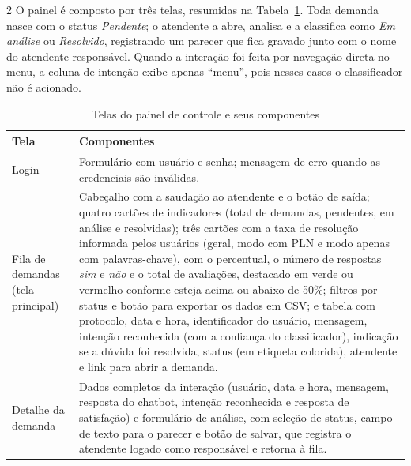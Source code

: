 \documentclass[10pt]{article}
\begin{document}
\begin{multicols}{2}
O painel é composto por três telas, resumidas na Tabela~\ref{tab:painel}.
Toda demanda nasce com o status \textit{Pendente}; o atendente a abre, analisa e
a classifica como \textit{Em análise} ou \textit{Resolvido}, registrando um
parecer que fica gravado junto com o nome do atendente responsável. Quando a
interação foi feita por navegação direta no menu, a coluna de intenção exibe
apenas ``menu'', pois nesses casos o classificador não é acionado.

\end{multicols}
\begin{table}[H]
  \centering
  \begin{tabular}{|p{}|p{}|}
    \hline
    \textbf{Tela} & \textbf{Componentes} \\ \hline
    Login & Formulário com usuário e senha; mensagem de erro quando as
    credenciais são inválidas. \\ \hline
    Fila de demandas (tela principal) &
    Cabeçalho com a saudação ao atendente e o botão de saída;
    quatro cartões de indicadores (total de demandas, pendentes, em análise e
    resolvidas); três cartões com a taxa de resolução informada pelos usuários
    (geral, modo com PLN e modo apenas com palavras-chave), com o percentual,
    o número de respostas \textit{sim} e \textit{não} e o total de avaliações,
    destacado em verde ou vermelho conforme esteja acima ou abaixo de 50\%;
    filtros por status e botão para exportar os dados em CSV; e tabela com
    protocolo, data e hora, identificador do usuário, mensagem, intenção
    reconhecida (com a confiança do classificador), indicação se a dúvida foi
    resolvida, status (em etiqueta colorida), atendente e link para abrir a
    demanda. \\ \hline
    Detalhe da demanda & Dados completos da interação (usuário, data e hora,
    mensagem, resposta do chatbot, intenção reconhecida e resposta de
    satisfação) e formulário de análise, com seleção de status, campo de texto
    para o parecer e botão de salvar, que registra o atendente logado como
    responsável e retorna à fila. \\ \hline
  \end{tabular}
  \caption{Telas do painel de controle e seus componentes}
  \label{tab:painel}
\end{table}
\begin{multicols}{2}

\IfFileExists{figures/painel_controle.png}{%
A Figura~\ref{fig:painel} apresenta a tela principal do painel.

\end{multicols}
\end{document}
